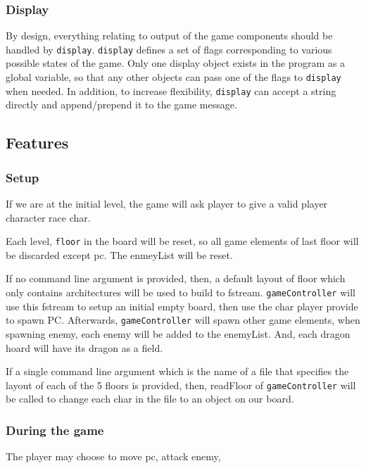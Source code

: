 \documentclass[11pt]{article}
\theoremstyle{plain} \newtheorem{theorem*}{Theorem}[subsection]
\begin{document}
\subsubsection{Display}
By design, everything relating to output of the game components should
be handled by \texttt{display}. \texttt{display} defines a set of flags
corresponding to various possible states of the game. Only one display
object exists in the program as a global variable, so that any other
objects can pass one of the flags to \texttt{display} when needed.
In addition, to increase flexibility, \texttt{display} can accept a 
string directly and append/prepend it to the game message.



\subsection{Features}

\subsubsection{Setup}

If we are at the initial level, 
the game will ask player to give a valid player character race char.

Each level, \texttt{floor} in the board will be reset, so all game elements of 
last floor will be discarded except pc. The \textsf{enmeyList} will be reset.

If no command line argument is provided, then, a default layout of floor which
only contains architectures will be used to build to fstream. 
\texttt{gameController} will use this fstream to setup an initial empty
board, then use the char player provide to spawn PC. Afterwards, 
\texttt{gameController} will spawn other game elements, when spawning 
enemy, each enemy will be added to the \textsf{enemyList}. And, each
dragon hoard will have its dragon as a field.

If a single command line argument which is the name of a file that specifies
the layout of each of the 5 floors is provided, then, \textsf{readFloor}
of \texttt{gameController} will be called to change each char in the file to
an object on our board. 


\subsubsection{ During the game }

The player may choose to move pc, attack enemy, 
\end{document}
